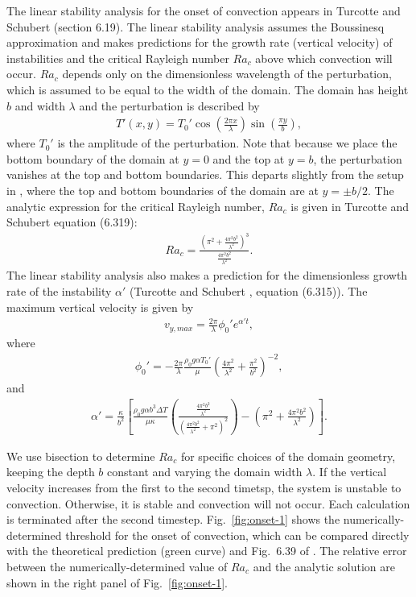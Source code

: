 \documentclass{article}
\begin{document}
The linear stability analysis for the onset of convection appears in Turcotte and Schubert \cite{TS14} (section 6.19). The linear stability analysis assumes the Boussinesq approximation and makes predictions for the growth rate (vertical velocity) of instabilities and the critical Rayleigh number $Ra_c$ above which convection will occur. $Ra_c$ depends only on the dimensionless wavelength of the perturbation, which is assumed to be equal to the width of the domain. The domain has height $b$ and width $\lambda$ and the perturbation is described by
\begin{align*}
T'(x,y) = T_0'\cos\left(\frac{2\pi x}{\lambda}\right)\sin\left(\frac{\pi y}{b} \right),
\end{align*}
where $T_0'$ is the amplitude of the perturbation. Note that because we place the bottom boundary of the domain at $y=0$ and the top at $y=b$, the perturbation vanishes at the top and bottom boundaries. This departs slightly from the setup in \cite{TS14}, where the top and bottom boundaries of the domain are at $y=\pm b/2$. The analytic expression for the critical Rayleigh number, $Ra_c$ is given in Turcotte and Schubert \cite{TS14} equation (6.319):
\begin{align*}
Ra_c=\frac{\left(\pi^2+\frac{4\pi^2 b^2}{\lambda^2}\right)^3}{\frac{4\pi^2 b^2}{\lambda^2}}.
\end{align*}
The linear stability analysis also makes a prediction for the dimensionless growth rate of the instability $\alpha'$ (Turcotte and Schubert \cite{TS14}, equation (6.315)). The maximum vertical velocity is given by
\begin{align*}
v_{y,max} = \frac{2\pi}{\lambda}\phi_0' e^{\alpha' t},
\end{align*}
where
\begin{align*}
\phi_0' = -\frac{2\pi}{\lambda}\frac{\rho_0 g \alpha T_0'}{\mu}\left(\frac{4\pi^2}{\lambda^2}+\frac{\pi^2}{b^2} \right)^{-2},
\end{align*}
and
\begin{align*}
\alpha'=\frac{\kappa}{b^2}\left[\frac{\rho_0 g \alpha b^3 \Delta T}{\mu \kappa}\left(\frac{\frac{4\pi^2 b^2}{\lambda^2}}{\left(\frac{4\pi^2 b^2}{\lambda^2}+\pi^2\right)^2}\right) -\left(\pi^2+\frac{4\pi^2b^2}{\lambda^2}\right)\right].
\end{align*}

We use bisection to determine $Ra_c$ for specific choices of the domain geometry, keeping the depth $b$ constant and varying the domain width $\lambda$. If the vertical velocity increases from the first to the second timetsp, the system is unstable to convection. Otherwise, it is stable and convection will not occur. Each calculation is terminated after the second timestep. Fig.~\ref{fig:onset-1} shows the numerically-determined threshold for the onset of convection, which can be compared directly with the theoretical prediction (green curve) and Fig.~6.39 of \cite{TS14}. The relative error between the numerically-determined value of $Ra_c$ and the analytic solution are shown in the right panel of Fig.~\ref{fig:onset-1}.
\end{document}
